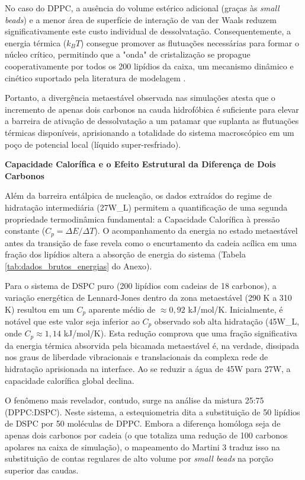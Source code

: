 No caso do DPPC, a ausência do volume estérico adicional (graças às \textit{small beads}) e a menor área de superfície de interação de van der Waals reduzem significativamente este custo individual de dessolvatação. Consequentemente, a energia térmica ($k_B T$) consegue promover as flutuações necessárias para formar o núcleo crítico, permitindo que a "onda" de cristalização se propague cooperativamente por todos os 200 lipídios da caixa, um mecanismo dinâmico e cinético suportado pela literatura de modelagem \cite{marrink2005, kowalik2015}. 

Portanto, a divergência metaestável observada nas simulações atesta que o incremento de apenas dois carbonos na cauda hidrofóbica é suficiente para elevar a barreira de ativação de dessolvatação a um patamar que suplanta as flutuações térmicas disponíveis, aprisionando a totalidade do sistema macroscópico em um poço de potencial local (líquido super-resfriado).


\vspace{1em}
\noindent\textbf{Capacidade Calorífica e o Efeito Estrutural da Diferença de Dois Carbonos}

Além da barreira entálpica de nucleação, os dados extraídos do regime de hidratação intermediária (27W\_L) permitem a quantificação de uma segunda propriedade termodinâmica fundamental: a Capacidade Calorífica à pressão constante ($C_p = \Delta E / \Delta T$). O acompanhamento da energia no estado metaestável antes da transição de fase revela como o encurtamento da cadeia acílica em uma fração dos lipídios altera a absorção de energia do sistema (Tabela \ref{tab:dados_brutos_energias} do Anexo).

Para o sistema de DSPC puro (200 lipídios com cadeias de 18 carbonos), a variação energética de Lennard-Jones dentro da zona metaestável (290 K a 310 K) resultou em um $C_p$ aparente médio de $\approx 0,92$ kJ/mol/K. Inicialmente, é notável que este valor seja inferior ao $C_p$ observado sob alta hidratação (45W\_L, onde $C_p \approx 1,14$ kJ/mol/K). Esta redução comprova que uma fração significativa da energia térmica absorvida pela bicamada metaestável é, na verdade, dissipada nos graus de liberdade vibracionais e translacionais da complexa rede de hidratação aprisionada na interface. Ao se reduzir a água de 45W para 27W, a capacidade calorífica global declina.

O fenômeno mais revelador, contudo, surge na análise da mistura 25:75 (DPPC:DSPC). Neste sistema, a estequiometria dita a substituição de 50 lipídios de DSPC por 50 moléculas de DPPC. Embora a diferença homóloga seja de apenas dois carbonos por cadeia (o que totaliza uma redução de 100 carbonos apolares na caixa de simulação), o mapeamento do Martini 3 traduz isso na substituição de contas regulares de alto volume por \textit{small beads} na porção superior das caudas.

